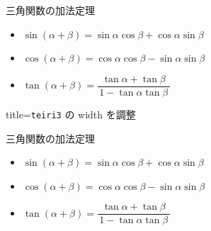 \documentclass[../geometrymemo.tex]{subfiles}
\begin{document}
\begin{teiri3}{三角関数の加法定理}
    \begin{itemize}\setlength{\itemsep}{3pt}
        \item \(\sin(\alpha+\beta) = \sin{\alpha}\cos{\beta}+\cos{\alpha}\sin{\beta}\)
        \item \(\cos(\alpha+\beta) = \cos{\alpha}\cos{\beta}-\sin{\alpha}\sin{\beta}\)
        \item \(\tan(\alpha+\beta) = \dfrac{\tan{\alpha}+\tan{\beta}}{\,1-\tan{\alpha}\tan{\beta}\,}\)
    \end{itemize}
\end{teiri3}

\begin{tcblisting}{title=\texttt{teiri3} の width を調整}
    \begin{teiri3}[width=0.45 \textwidth]{三角関数の加法定理}
        \begin{itemize}\setlength{\itemsep}{3pt}
            \item \(\sin(\alpha+\beta) = \sin{\alpha}\cos{\beta}+\cos{\alpha}\sin{\beta}\)
            \item \(\cos(\alpha+\beta) = \cos{\alpha}\cos{\beta}-\sin{\alpha}\sin{\beta}\)
            \item \(\tan(\alpha+\beta) = \dfrac{\tan{\alpha}+\tan{\beta}}{\,1-\tan{\alpha}\tan{\beta}\,}\)
        \end{itemize}
    \end{teiri3}
\end{tcblisting}
\end{document}
